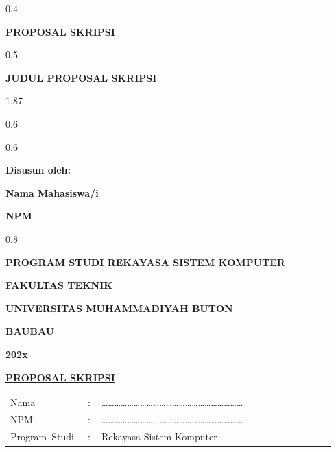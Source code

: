 \thispagestyle{empty}
\begin{ruang}{0.4}\end{ruang}
\begin{sampulbesar}
\textbf{PROPOSAL SKRIPSI}
\end{sampulbesar}
\begin{ruang}{0.5}\end{ruang}
\begin{sampulbesar}
\textbf{JUDUL PROPOSAL SKRIPSI}
\end{sampulbesar}
\begin{ruang}{1.87}\end{ruang}
\begin{ruang}{0.6}\end{ruang}
\begin{tengah}
\logo{4.5cm}
\end{tengah}
\begin{ruang}{0.6}\end{ruang}
\begin{sampulsedang}
\textbf{Disusun oleh:}

\textbf{Nama Mahasiswa/i}

\textbf{NPM}
\end{sampulsedang}
\begin{ruang}{0.8}\end{ruang}
\begin{sampulsedang}
\textbf{PROGRAM STUDI REKAYASA SISTEM KOMPUTER}

\textbf{FAKULTAS TEKNIK}

\textbf{UNIVERSITAS MUHAMMADIYAH BUTON}

\textbf{BAUBAU}

\textbf{202x}
\end{sampulsedang}
\begin{halamanbaru}\end{halamanbaru}

\thispagestyle{empty}
\begin{tengah}
\textbf{\underline{PROPOSAL SKRIPSI}}
\end{tengah}

\begin{tanpagaris}
\begin{longtable}{@{}p{0.22\linewidth}p{0.04\linewidth}p{0.68\linewidth}@{}}
Nama & : & ………………………………………………………… \\[6pt]
NPM & : & ………………………………………………………… \\[6pt]
\mbox{Program Studi} & : & Rekayasa Sistem Komputer \\
\end{longtable}
\end{tanpagaris}

